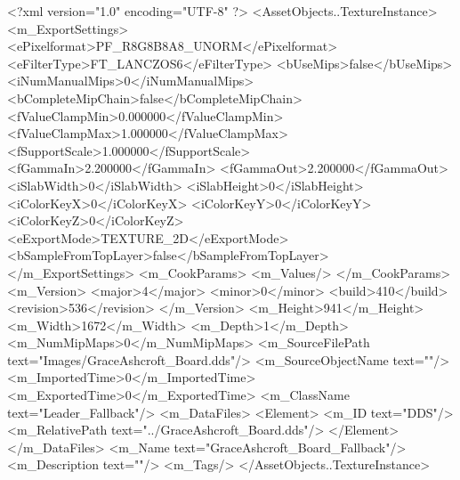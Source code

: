 <?xml version="1.0" encoding="UTF-8" ?>
<AssetObjects..TextureInstance>
	<m_ExportSettings>
		<ePixelformat>PF_R8G8B8A8_UNORM</ePixelformat>
		<eFilterType>FT_LANCZOS6</eFilterType>
		<bUseMips>false</bUseMips>
		<iNumManualMips>0</iNumManualMips>
		<bCompleteMipChain>false</bCompleteMipChain>
		<fValueClampMin>0.000000</fValueClampMin>
		<fValueClampMax>1.000000</fValueClampMax>
		<fSupportScale>1.000000</fSupportScale>
		<fGammaIn>2.200000</fGammaIn>
		<fGammaOut>2.200000</fGammaOut>
		<iSlabWidth>0</iSlabWidth>
		<iSlabHeight>0</iSlabHeight>
		<iColorKeyX>0</iColorKeyX>
		<iColorKeyY>0</iColorKeyY>
		<iColorKeyZ>0</iColorKeyZ>
		<eExportMode>TEXTURE_2D</eExportMode>
		<bSampleFromTopLayer>false</bSampleFromTopLayer>
	</m_ExportSettings>
	<m_CookParams>
		<m_Values/>
	</m_CookParams>
	<m_Version>
		<major>4</major>
		<minor>0</minor>
		<build>410</build>
		<revision>536</revision>
	</m_Version>
	<m_Height>941</m_Height>
	<m_Width>1672</m_Width>
	<m_Depth>1</m_Depth>
	<m_NumMipMaps>0</m_NumMipMaps>
	<m_SourceFilePath text="Images/GraceAshcroft_Board.dds"/>
	<m_SourceObjectName text=""/>
	<m_ImportedTime>0</m_ImportedTime>
	<m_ExportedTime>0</m_ExportedTime>
	<m_ClassName text="Leader_Fallback"/>
	<m_DataFiles>
		<Element>
			<m_ID text="DDS"/>
			<m_RelativePath text="../GraceAshcroft_Board.dds"/>
		</Element>
	</m_DataFiles>
	<m_Name text="GraceAshcroft_Board_Fallback"/>
	<m_Description text=""/>
	<m_Tags/>
</AssetObjects..TextureInstance>
